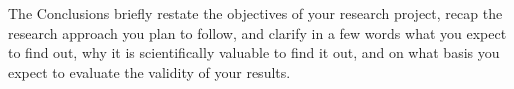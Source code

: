 The Conclusions briefly restate the objectives of your research project, recap the research approach you plan to follow, and clarify in a few words what you expect to find out, why it is scientifically valuable to find it out, and on what basis you expect to evaluate the validity of your results.